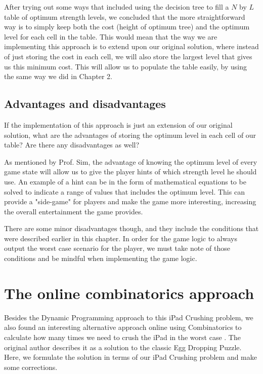 \documentclass[12pt,a4paper,oneside]{report}
\begin{document}
After trying out some ways that included using the decision tree to fill a $N$ by $L$ table of optimum strength levels, we concluded that the more straightforward way is to simply keep both the cost (height of optimum tree) and the optimum level for each cell in the table. This would mean that the way we are implementing this approach is to extend upon our original solution, where instead of just storing the cost in each cell, we will also store the largest level that gives us this minimum cost. This will allow us to populate the table easily, by using the same way we did in Chapter 2.

\section{Advantages and disadvantages}
If the implementation of this approach is just an extension of our original solution, what are the advantages of storing the optimum level in each cell of our table? Are there any disadvantages as well? 

As mentioned by Prof. Sim, the advantage of knowing the optimum level of every game state will allow us to give the player hints of which strength level he should use. An example of a hint can be in the form of mathematical equations to be solved to indicate a range of values that includes the optimum level. This can provide a "side-game" for players and make the game more interesting, increasing the overall entertainment the game provides. 

There are some minor disadvantages though, and they include the conditions that were described earlier in this chapter. In order for the game logic to always output the worst case scenario for the player, we must take note of those conditions and be mindful when implementing the game logic.


\chapter{The online combinatorics approach}
Besides the Dynamic Programming approach to this iPad Crushing problem, we also found an interesting alternative approach online using Combinatorics to calculate how many times we need to crush the iPad in the worst case \cite{randomblogpost}. The original author describes it as a solution to the classic Egg Dropping Puzzle. Here, we formulate the solution in terms of our iPad Crushing problem and make some corrections.
\end{document}
